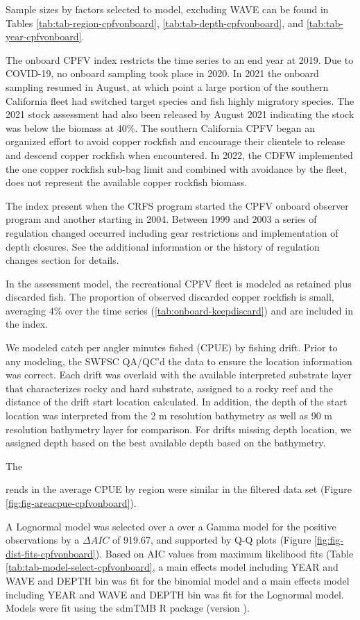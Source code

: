 \documentclass[11pt,
  english,
  letterpaper,
]{article}
\begin{document}
Sample sizes by factors selected to model, excluding WAVE can be found in Tables \ref{tab:tab-region-cpfvonboard}, \ref{tab:tab-depth-cpfvonboard}, and \ref{tab:tab-year-cpfvonboard}.

The onboard CPFV index restricts the time series to an end year at 2019. Due to COVID-19, no onboard sampling took place in 2020. In 2021 the onboard sampling resumed in August, at which point a large portion of the southern California fleet had switched target species and fish highly migratory species. The 2021 stock assessment had also been released by August 2021 indicating the stock was below the biomass at 40\%. The southern California CPFV began an organized effort to avoid copper rockfish and encourage their clientele to release and descend copper rockfish when encountered. In 2022, the CDFW implemented the one copper rockfish sub-bag limit and combined with avoidance by the fleet, does not represent the available copper rockfish biomass.

The index present when the CRFS program started the CPFV onboard observer program and another starting in 2004. Between 1999 and 2003 a series of regulation changed occurred including gear restrictions and implementation of depth closures. See the additional information or the history of regulation changes section for details.

In the assessment model, the recreational CPFV fleet is modeled as retained plus discarded fish. The proportion of observed discarded copper rockfish is small, averaging 4\% over the time series (\ref{tab:onboard-keepdiscard}) and are included in the index.

We modeled catch per angler minutes fished (CPUE) by fishing drift. Prior to any modeling, the SWFSC QA/QC'd the data to ensure the location information was correct. Each drift was overlaid with the available interpreted substrate layer that characterizes rocky and hard substrate, assigned to a rocky reef and the distance of the drift start location calculated. In addition, the depth of the start location was interpreted from the 2 m resolution bathymetry as well as 90 m resolution bathymetry layer for comparison. For drifts missing depth location, we assigned depth based on the best available depth based on the bathymetry.

The

rends in the average CPUE by region were similar in the filtered data set (Figure \ref{fig:fig-areacpue-cpfvonboard}).

A Lognormal model was selected over a over a Gamma model for the positive observations by a \(\Delta AIC\) of 919.67, and supported by Q-Q plots (Figure \ref{fig:fig-dist-fits-cpfvonboard}). Based on AIC values from maximum likelihood fits (Table \ref{tab:tab-model-select-cpfvonboard}, a main effects model including YEAR and WAVE and DEPTH bin was fit for the binomial model and a main effects model including YEAR and WAVE and DEPTH bin was fit for the Lognormal model. Models were fit using the sdmTMB R package (version ).
\end{document}
